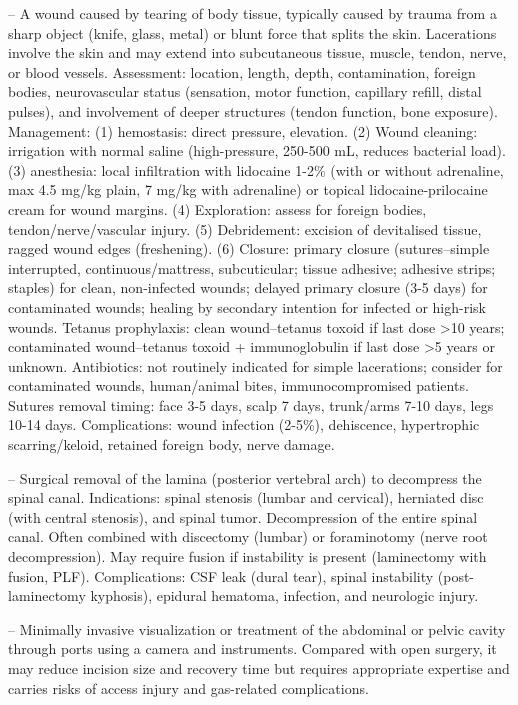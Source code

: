 -- A wound caused by tearing of body tissue, typically caused by trauma from a sharp object (knife, glass, metal) or blunt force that splits the skin. Lacerations involve the skin and may extend into subcutaneous tissue, muscle, tendon, nerve, or blood vessels. Assessment: location, length, depth, contamination, foreign bodies, neurovascular status (sensation, motor function, capillary refill, distal pulses), and involvement of deeper structures (tendon function, bone exposure). Management: (1) hemostasis: direct pressure, elevation. (2) Wound cleaning: irrigation with normal saline (high-pressure, 250-500 mL, reduces bacterial load). (3) anesthesia: local infiltration with lidocaine 1-2\% (with or without adrenaline, max 4.5 mg/kg plain, 7 mg/kg with adrenaline) or topical lidocaine-prilocaine cream for wound margins. (4) Exploration: assess for foreign bodies, tendon/nerve/vascular injury. (5) Debridement: excision of devitalised tissue, ragged wound edges (freshening). (6) Closure: primary closure (sutures--simple interrupted, continuous/mattress, subcuticular; tissue adhesive; adhesive strips; staples) for clean, non-infected wounds; delayed primary closure (3-5 days) for contaminated wounds; healing by secondary intention for infected or high-risk wounds. Tetanus prophylaxis: clean wound--tetanus toxoid if last dose >10 years; contaminated wound--tetanus toxoid + immunoglobulin if last dose >5 years or unknown. Antibiotics: not routinely indicated for simple lacerations; consider for contaminated wounds, human/animal bites, immunocompromised patients. Sutures removal timing: face 3-5 days, scalp 7 days, trunk/arms 7-10 days, legs 10-14 days. Complications: wound infection (2-5\%), dehiscence, hypertrophic scarring/keloid, retained foreign body, nerve damage.

-- Surgical removal of the lamina (posterior vertebral arch) to decompress the spinal canal. Indications: spinal stenosis (lumbar and cervical), herniated disc (with central stenosis), and spinal tumor. Decompression of the entire spinal canal. Often combined with discectomy (lumbar) or foraminotomy (nerve root decompression). May require fusion if instability is present (laminectomy with fusion, PLF). Complications: CSF leak (dural tear), spinal instability (post-laminectomy kyphosis), epidural hematoma, infection, and neurologic injury.

-- Minimally invasive visualization or treatment of the abdominal or pelvic cavity through ports using a camera and instruments. Compared with open surgery, it may reduce incision size and recovery time but requires appropriate expertise and carries risks of access injury and gas-related complications.


